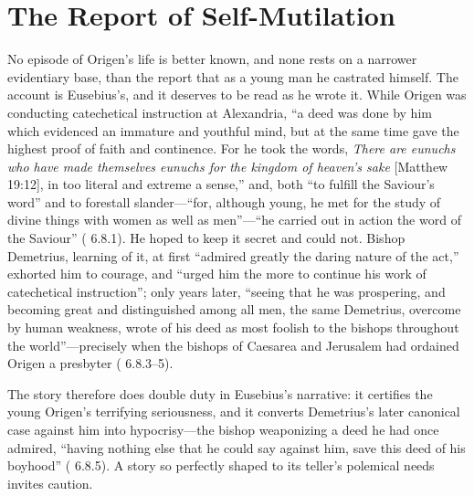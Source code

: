 \section{The Report of Self-Mutilation}

No episode of Origen's life is better known, and none rests on a narrower
evidentiary base, than the report that as a young man he castrated himself.
The account is Eusebius's, and it deserves to be read as he wrote it. While
Origen was conducting catechetical instruction at Alexandria, ``a deed was
done by him which evidenced an immature and youthful mind, but at the same
time gave the highest proof of faith and continence. For he took the words,
\emph{There are eunuchs who have made themselves eunuchs for the kingdom of
heaven's sake} [Matthew 19:12], in too literal and extreme a sense,'' and,
both ``to fulfill the Saviour's word'' and to forestall slander---``for,
although young, he met for the study of divine things with women as well as
men''---``he carried out in action the word of the Saviour'' ( 6.8.1). He hoped to keep it secret and could not. Bishop Demetrius,
learning of it, at first ``admired greatly the daring nature of the act,''
exhorted him to courage, and ``urged him the more to continue his work of
catechetical instruction''; only years later, ``seeing that he was
prospering, and becoming great and distinguished among all men, the same
Demetrius, overcome by human weakness, wrote of his deed as most foolish to
the bishops throughout the world''---precisely when the bishops of Caesarea
and Jerusalem had ordained Origen a presbyter (
6.8.3--5).

The story therefore does double duty in Eusebius's narrative: it certifies
the young Origen's terrifying seriousness, and it converts Demetrius's later
canonical case against him into hypocrisy---the bishop weaponizing a deed he
had once admired, ``having nothing else that he could say against him, save
this deed of his boyhood'' ( 6.8.5). A story so
perfectly shaped to its teller's polemical needs invites caution.

